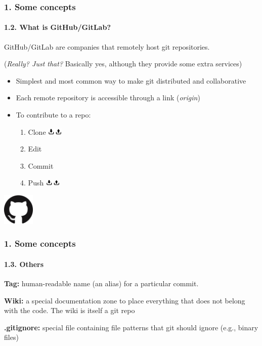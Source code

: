 \documentclass[dvipsnames]{beamer}
\begin{document}
\begin{frame}
\frametitle{1. Some concepts}
\framesubtitle{1.2. What is GitHub/GitLab?}

GitHub/GitLab are companies that remotely host git repositories.

{\footnotesize (\textit{Really? Just that?} Basically yes, although they provide some extra services) }

\vspace{0.5em}

\vspace{1em}

\begin{minipage}{0.60\textwidth}
  \begin{itemize}
    \item Simplest and most common way to make git distributed and collaborative
    \item Each remote repository is accessible through a link (\textit{origin})
    \item To contribute to a repo:
    \begin{enumerate}
      \item Clone \includegraphics[height=3mm]{img/upload-download}
      \item Edit
      \item Commit
      \item Push \includegraphics[height=3mm]{img/upload-download}
    \end{enumerate}
  \end{itemize}
\end{minipage}%
\begin{minipage}{0.40\textwidth}
  \centering
  \includegraphics[width=15mm]{img/GitHub-logo}\hspace{0.5em}
  
\end{minipage}

\end{frame}

\begin{frame}
\frametitle{1. Some concepts}
\framesubtitle{1.3. Others}

\textbf{Tag:} human-readable name (an alias) for a particular commit.

\textbf{Wiki:} a special documentation zone to place everything that does not belong with the code.
The wiki is itself a git repo

\textbf{.gitignore:} special file containing file patterns that git should ignore (e.g., binary files)

\end{frame}
\end{document}
